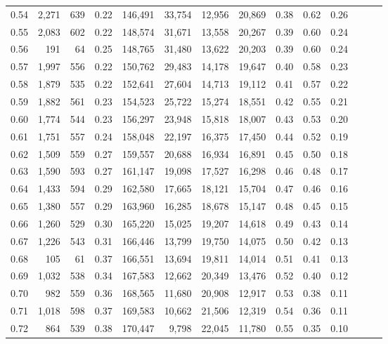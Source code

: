\begin{tabular}{rrrrrrrrrrrrrr}
0.54 &  2,271 &  639 &  0.22 &  146,491 &   33,754 &  12,956 &  20,869 &  0.38 &  0.62 &      0.26 \\
0.55 &  2,083 &  602 &  0.22 &  148,574 &   31,671 &  13,558 &  20,267 &  0.39 &  0.60 &      0.24 \\
0.56 &    191 &   64 &  0.25 &  148,765 &   31,480 &  13,622 &  20,203 &  0.39 &  0.60 &      0.24 \\
0.57 &  1,997 &  556 &  0.22 &  150,762 &   29,483 &  14,178 &  19,647 &  0.40 &  0.58 &      0.23 \\
0.58 &  1,879 &  535 &  0.22 &  152,641 &   27,604 &  14,713 &  19,112 &  0.41 &  0.57 &      0.22 \\
0.59 &  1,882 &  561 &  0.23 &  154,523 &   25,722 &  15,274 &  18,551 &  0.42 &  0.55 &      0.21 \\
0.60 &  1,774 &  544 &  0.23 &  156,297 &   23,948 &  15,818 &  18,007 &  0.43 &  0.53 &      0.20 \\
0.61 &  1,751 &  557 &  0.24 &  158,048 &   22,197 &  16,375 &  17,450 &  0.44 &  0.52 &      0.19 \\
0.62 &  1,509 &  559 &  0.27 &  159,557 &   20,688 &  16,934 &  16,891 &  0.45 &  0.50 &      0.18 \\
0.63 &  1,590 &  593 &  0.27 &  161,147 &   19,098 &  17,527 &  16,298 &  0.46 &  0.48 &      0.17 \\
0.64 &  1,433 &  594 &  0.29 &  162,580 &   17,665 &  18,121 &  15,704 &  0.47 &  0.46 &      0.16 \\
0.65 &  1,380 &  557 &  0.29 &  163,960 &   16,285 &  18,678 &  15,147 &  0.48 &  0.45 &      0.15 \\
0.66 &  1,260 &  529 &  0.30 &  165,220 &   15,025 &  19,207 &  14,618 &  0.49 &  0.43 &      0.14 \\
0.67 &  1,226 &  543 &  0.31 &  166,446 &   13,799 &  19,750 &  14,075 &  0.50 &  0.42 &      0.13 \\
0.68 &    105 &   61 &  0.37 &  166,551 &   13,694 &  19,811 &  14,014 &  0.51 &  0.41 &      0.13 \\
0.69 &  1,032 &  538 &  0.34 &  167,583 &   12,662 &  20,349 &  13,476 &  0.52 &  0.40 &      0.12 \\
0.70 &    982 &  559 &  0.36 &  168,565 &   11,680 &  20,908 &  12,917 &  0.53 &  0.38 &      0.11 \\
0.71 &  1,018 &  598 &  0.37 &  169,583 &   10,662 &  21,506 &  12,319 &  0.54 &  0.36 &      0.11 \\
0.72 &    864 &  539 &  0.38 &  170,447 &    9,798 &  22,045 &  11,780 &  0.55 &  0.35 &      0.10 \\

\end{tabular}

